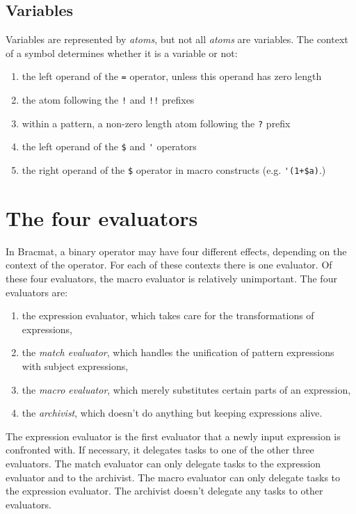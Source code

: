 \documentclass[12pt]{article}
\begin{document}
\subsection{Variables}

Variables are represented by \emph{atoms}, but not all \emph{atoms}
are variables. The context of a symbol determines whether it is a
variable or not:
\begin{enumerate}
\item the left operand of the \verb|=| operator, unless this operand
  has zero length
\item the atom following the \verb|!| and \verb|!!| prefixes
\item within a pattern, a non-zero length atom following the \verb|?| prefix
\item the left operand of the \verb|$| and \verb|'| operators
\item the right operand of the \verb|$| operator in macro constructs
  (e.g. \verb|'(1+$a)|.)
\end{enumerate}

\section{The four evaluators}

In Bracmat, a binary operator may have four different effects,
depending on the context of the operator. For each of these contexts
there is one evaluator. Of these four evaluators, the macro evaluator
is relatively unimportant. The four evaluators are:
\begin{enumerate}
\item the expression evaluator, which takes care for the
  transformations of expressions,
\item the \emph{match evaluator}, which handles the unification of pattern
  expressions with subject expressions,
\item the \emph{macro evaluator}, which merely substitutes certain parts of
  an expression,
\item the \emph{archivist}, which doesn't do anything but keeping expressions
  alive.
\end{enumerate}

The expression evaluator is the first evaluator that a newly input
expression is confronted with. If necessary, it delegates tasks to one
of the other three evaluators. The match evaluator can only delegate
tasks to the expression evaluator and to the archivist. The macro
evaluator can only delegate tasks to the expression evaluator. The
archivist doesn't delegate any tasks to other evaluators.
\end{document}
